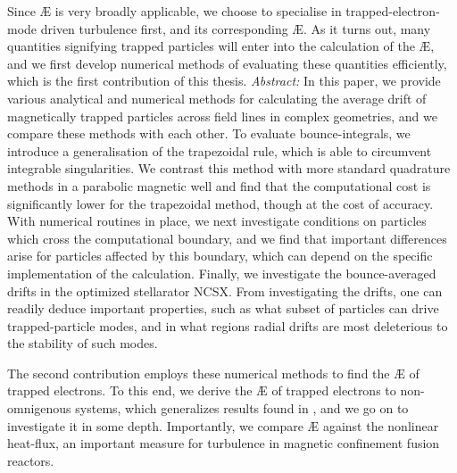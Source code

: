 Since \AE{} is very broadly applicable, we choose to specialise in trapped-electron-mode driven turbulence first, and its corresponding \AE{}. As it turns out, many quantities signifying trapped particles will enter into the calculation of the \AE{}, and we first develop numerical methods of evaluating these quantities efficiently, which is the first contribution of this thesis.
\textit{Abstract:} In this paper, we provide various analytical and numerical methods for calculating the average drift of magnetically trapped particles across field lines in complex geometries, and we compare these methods with each other. To evaluate bounce-integrals, we introduce a generalisation of the trapezoidal rule, which is able to circumvent integrable singularities. We contrast this method with more standard quadrature methods in a parabolic magnetic well and find that the computational cost is significantly lower for the trapezoidal method, though at the cost of accuracy. With numerical routines in place, we next investigate conditions on particles which cross the computational boundary, and we find that important differences arise for particles affected by this boundary, which can depend on the specific implementation of the calculation. Finally, we investigate the bounce-averaged drifts in the optimized stellarator NCSX. From investigating the drifts, one can readily deduce important properties, such as what subset of particles can drive trapped-particle modes, and in what regions radial drifts are most deleterious to the stability of such modes.
 \par 
The second contribution employs these numerical methods to find the \AE{} of trapped electrons. To this end, we derive the \AE{} of trapped electrons to non-omnigenous systems, which generalizes results found in \citet{helander2020available}, and we go on to investigate it in some depth. Importantly, we compare \AE{} against the nonlinear heat-flux, an important measure for turbulence in magnetic confinement fusion reactors. 
 \\
